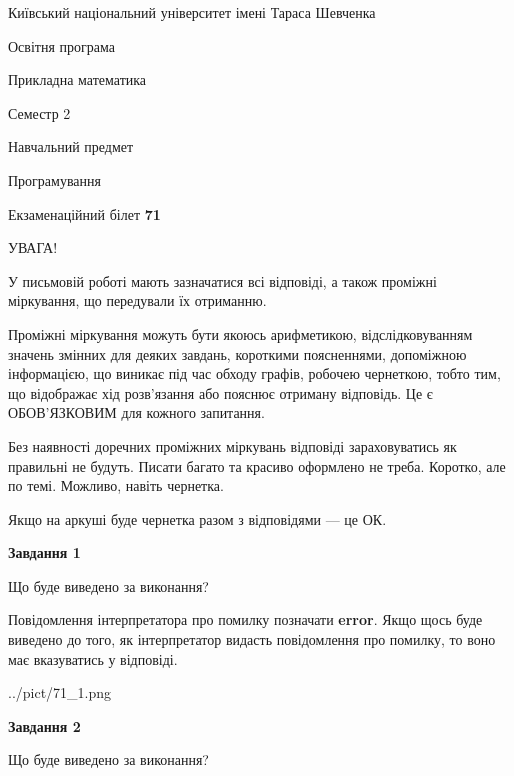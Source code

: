 \documentclass[12pt, ukrainian]{article}
\begin{document}
{{\begin {small}\par
{ \center  Київський національний університет імені Тараса Шевченка \par}
{\parbox {5 cm}{Освітня програма \hfill}{\parbox {7 cm}{Прикладна математика \hfill}}\parbox {6 cm}{\hfill Семестр 2}}\par
{\parbox {5 cm} {Навчальний предмет \hfill}\parbox {7 cm}{Програмування \hfill}\parbox {6cm}{\hfill}\par}\vspace{-7pt} \end{small}}{\center Екзаменаційний білет \No \textbf
{ 71 }\par}}
{
\begin {large}
УВАГА!

У письмовій роботі мають зазначатися всі відповіді, а також проміжні міркування, що передували їх отриманню.

Проміжні міркування можуть бути якоюсь арифметикою, відслідковуванням зна\-чень змінних для деяких завдань,
короткими поясненнями, допоміжною інформацією, що виникає під час обходу графів, робочею чернеткою,
тобто тим, що відображає хід розв’язання або пояснює отриману відповідь.
Це є ОБОВ’ЯЗКОВИМ для кожного запитання.

Без наявності доречних проміжних міркувань відповіді зараховуватись як правиль\-ні не будуть.
Писати багато та красиво оформлено не треба. Коротко, але по темі. Можли\-во, навіть чернетка.

Якщо на аркуші буде чернетка разом з відповідями --- це ОК.

\newpage

{\begin {center}\textbf{Завдання 1}\end {center}}\par
Що буде виведено за виконання?

Повідомлення інтерпретатора про помилку позначати \textbf{error}.
Якщо щось буде виведено до того, як інтерпретатор видасть повідомлення про помилку, 
то воно має вказуватись у відповіді. \par


\begin{center}
	{../pict/71_1.png}
\end{center}
\newpage

{\begin {center}\textbf{Завдання 2}\end {center}}\par
Що буде виведено за виконання?


\end{large}}
\end{document}
